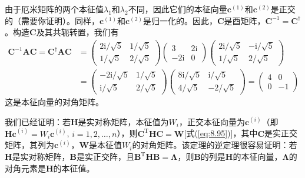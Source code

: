 \begin{examplebox}
        由于厄米矩阵的两个本征值$\lambda_1$和$\lambda_2$不同，因此它们的本征向量$\mathbf{c}^{\left(1\right)}$和$\mathbf{c}^{\left(2\right)}$是正交的（需要你证明）。同样，$\mathbf{c}^{\left(1\right)}$和$\mathbf{c}^{\left(2\right)}$是归一化的。因此，$\mathbf{C}$是酉矩阵，$\mathbf{C}^{-1} = \mathbf{C}^{\dagger}$。构造$\mathbf{C}$及其共轭转置，我们有
        \begin{equation*}
            \begin{aligned}
                \mathbf{C}^{-1} \mathbf{AC} = \mathbf{C}^{\dagger} \mathbf{A} \mathbf{C} &= \begin{pmatrix}
                    2\mathrm{i}/\sqrt{5} & 1/\sqrt{5} \\
                    1/\sqrt{5} & 2/\sqrt{5}
                \end{pmatrix} \begin{pmatrix}
                    3 & 2\mathrm{i} \\
                    -2\mathrm{i} & 0
                \end{pmatrix} \begin{pmatrix}
                    2\mathrm{i}/\sqrt{5} & -\mathrm{i}/\sqrt{5} \\
                    1/\sqrt{5} & 2/\sqrt{5}
                \end{pmatrix} \\
                &= \begin{pmatrix}
                    -2\mathrm{i}/\sqrt{5} & 1/\sqrt{5} \\
                    \mathrm{i}/\sqrt{5} & 2/\sqrt{5}
                \end{pmatrix} \begin{pmatrix}
                    8\mathrm{i}/\sqrt{5} & \mathrm{i}/\sqrt{5} \\
                    4/\sqrt{5} & -2/\sqrt{5}
                \end{pmatrix}  = \begin{pmatrix}
                    4 & 0 \\
                    0 & -1
                \end{pmatrix}
            \end{aligned}
        \end{equation*}
        这是本征向量的对角矩阵。
    \end{examplebox}

    我们已经证明：若$\mathbf{H}$是实对称矩阵，本征值为$W_i$，正交本征向量为$\mathbf{c}^{\left(i\right)}$（即$\mathbf{Hc}^{\left(i\right)} = W_i\mathbf{c}^{\left(i\right)}$, $i = 1,2,\ldots,n$），则$\mathbf{C}^{\mathrm{T}}\mathbf{H}\mathbf{C} = \mathbf{W}$[式(\ref{eq:8.95})]，其中$\mathbf{C}$是实正交矩阵，其列为$\mathbf{c}^{\left(i\right)}$，$\mathbf{W}$是本征值$W_i$的对角矩阵。该定理的逆定理很容易证明：若$\mathbf{H}$是实对称矩阵，$\mathbf{B}$是实正交阵，且$\mathbf{B}^{\mathrm{T}}\mathbf{H}\mathbf{B} = \mathbf{\Lambda}$，则$\mathbf{B}$的列是$\mathbf{H}$的本征向量，$\mathbf{\Lambda}$的对角元素是$\mathbf{H}$的本征值。

